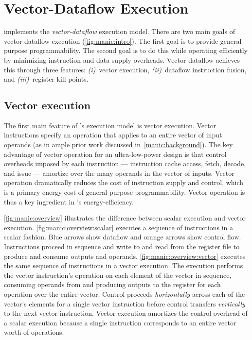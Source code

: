 \section{Vector-Dataflow Execution}
\label{manic:design}

\figMANICOverview

\manic implements the {\em vector-dataflow} execution model. There are
two main goals of vector-dataflow execution (\autoref{fig:manic:intro}).
The first goal is to provide general-purpose programmability.  The
second goal is to do this while operating efficiently by minimizing
instruction and data supply overheads.
%
Vector-dataflow achieves this through three features:
\emph{(i)}~vector execution,
\emph{(ii)}~dataflow instruction fusion, and
\emph{(iii)}~register kill points.

\subsection{Vector execution}
The first main feature of \manic's execution model is vector execution. Vector
instructions specify an operation that applies to an entire vector of input
operands (as in ample prior work discussed in~\autoref{manic:background}).  The
key advantage of vector operation for an ultra-low-power design is that control overheads imposed by each
instruction --- instruction cache access, fetch, decode, and issue --- amortize
over the many operands in the vector of inputs.   Vector operation dramatically
reduces the cost of instruction supply and control, which is a primary energy cost of
general-purpose programmability.  Vector operation is thus a key ingredient in
\manic's energy-efficiency. 

\autoref{fig:manic:overview} illustrates the difference between scalar execution
and vector execution.
%
\autoref{fig:manic:overview:scalar} executes a sequence of instructions in a scalar fashion.
%
Blue arrows show dataflow and orange arrows show control flow.
%
Instructions proceed in sequence and write to and read from the register file
to produce and consume outputs and operands.
%
\autoref{fig:manic:overview:vector} executes the same sequence of instructions in a vector execution.
%
The execution performs the vector instruction's operation on each element of
the vector in sequence, consuming operands from and producing outputs to the
register for each operation over the entire vector.
%
Control proceeds {\em horizontally} across each of the vector's elements for a
single vector instruction before control transfers {\em vertically} to the next
vector instruction.
%
Vector execution amortizes the control overhead of a scalar execution because a
single instruction corresponds to an entire vector worth of operations.
%

